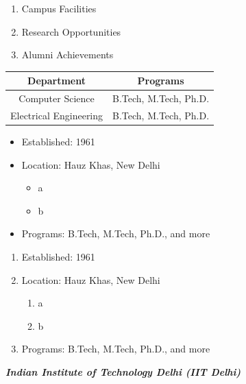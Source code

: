 \documentclass{article}
\begin{document}
\begin{enumerate}
    \item Campus Facilities
    \item Research Opportunities
    \item Alumni Achievements
\end{enumerate}

\begin{tabular}{|c|c|}
\hline
Department & Programs \\
\hline
Computer Science & B.Tech, M.Tech, Ph.D. \\
Electrical Engineering & B.Tech, M.Tech, Ph.D. \\
\hline
\end{tabular}

\begin{itemize}
    \item Established: 1961
    \item Location: Hauz Khas, New Delhi
    \begin{itemize}
        \item a
        \item b
    \end{itemize}
    \item Programs: B.Tech, M.Tech, Ph.D., and more
\end{itemize}


\begin{enumerate}
    \item Established: 1961
    \item Location: Hauz Khas, New Delhi
    \begin{enumerate}
        \item a
        \item b
    \end{enumerate}
    \item Programs: B.Tech, M.Tech, Ph.D., and more
\end{enumerate}

\textit{\textbf{Indian Institute of Technology Delhi (IIT Delhi)}}
\end{document}
